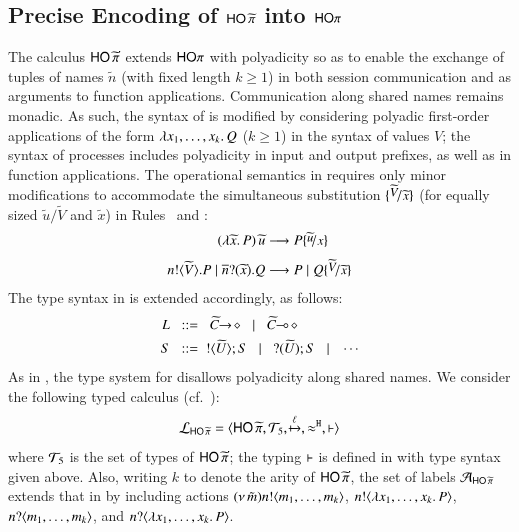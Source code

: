 \documentclass[preprint,11pt]{elsarticle}
\begin{document}
{\subsection{Precise Encoding of $\mathsf{HO}\,{\widetilde{\pi}}$ into $\mathsf{HO}\pi$}\label{ss:poly}
The calculus  
$\mathsf{HO}\,{\widetilde{\pi}}$ 
extends $\mathsf{HO}\pi$ 
with polyadicity so as to 
enable the exchange of tuples of names $\widetilde{n}$ (with fixed length $k \geq 1$) in both session communication  and as arguments 
to function applications.
 Communication along shared names remains monadic.
As such, the syntax of
is modified by considering  
polyadic first-order applications of the form
 $\lambda x_1, \ldots, x_k.\,Q$ ($k \geq 1$)
 in the syntax of values $V$;
the syntax of processes includes polyadicity in input and output prefixes, 
 as well as in function applications. 
The operational semantics in  requires only minor modifications to accommodate the simultaneous substitution $\subst{\widetilde{V}}{\widetilde{x}}$ (for equally sized $\widetilde{u}/\widetilde{V}$ and $\widetilde{x}$)
in Rules~ and :
	\begin{align*}
		\appl{(\abs{\widetilde{x}}{P})}{\widetilde{u}}   & \red  P \subst{\widetilde{u}}{x} 
		\\[1mm]
		\bout{n}{\widetilde{V}} P \Par \binp{\dual{n}}{\widetilde{x}} Q & \red  P \Par Q \subst{\widetilde{V}}{\widetilde{x}} 
	\end{align*}
The type syntax in  is extended accordingly, as follows:
%
\begin{align*}
		L & \;\;::=\;\; \widetilde{C}\!\! \rightarrow\! \diamond \;\;\;|\;\;\; \widetilde{C}\!\! \multimap\! \diamond
		\\
		S & \;\;::=\;\;  ! \langle \widetilde{U} \rangle ; S \;\;\;|\;\;\; ? (\widetilde{U}) ; S \;\;\;|\;\;\; \cdots
\end{align*}
As in \cite{tlca07,MostrousY15},
the type system for \PHOp 
disallows polyadicity along
shared names.
We consider the following typed calculus
 (cf.~):
	$$\mathcal{L}_{\mathsf{HO}\,{\widetilde{\pi}}}=\langle \mathsf{HO}\,{\widetilde{\pi}}, {\cal{T}}_5, \xmapsto{\ell}, \approx^\mathtt{H}, \vdash \rangle$$
where 
	${\cal{T}}_5$ is the set of types of $\mathsf{HO}\,{\widetilde{\pi}}$;  
the typing $\vdash$ is defined
in 
with  type syntax given above.
Also, writing $k$ to denote the arity of $\mathsf{HO}\,{\widetilde{\pi}}$, the set of labels 
$\mathcal{A}_{\mathsf{HO}\,{\widetilde{\pi}}}$ extends that in  by 
including actions
$(\nu\, \tilde{m}) n ! \langle m_1, \ldots, m_k \rangle$,
$n ! \langle \lambda x_1, \ldots, x_k.\,P \rangle$,
$ n ? \langle m_1, \ldots, m_k \rangle$,
and
$n ? \langle \lambda x_1, \ldots, x_k.\,P \rangle$.

}
\end{document}
